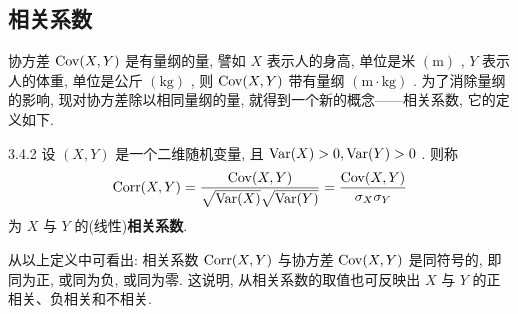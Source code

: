 	\subsection{相关系数}\label{ssec:3.4.4}
	协方差 $\operatorname{Cov}(X, Y)$ 是有量纲的量, 譬如 $X$ 表示人的身高, 单位是米 $(\mathrm{m})$ , $Y$ 表示人的体重, 单位是公斤 $(\mathrm{kg})$ , 则 $\operatorname{Cov}(X, Y)$ 带有量纲 $(\mathrm{m\cdot kg})$ . 为了消除量纲的影响, 现对协方差除以相同量纲的量, 就得到一个新的概念——相关系数, 它的定义如下.
	\begin{definition}{}{3.4.2}
		设 $(X,Y)$ 是一个二维随机变量, 且 $\operatorname{Var}(X)>0,\operatorname{Var}(Y)>0$ . 则称
		\begin{equation}\label{eq:3.4.10}
			\operatorname{Corr}(X, Y)=\frac{\operatorname{Cov}(X, Y)}{\sqrt{\operatorname{Var}(X)}\sqrt{\operatorname{Var}(Y)}}=\frac{\operatorname{Cov}(X, Y)}{\sigma_{X} \sigma_{Y}}
		\end{equation}
		为 $X$ 与 $Y$ 的(线性)\textbf{相关系数}.
	\end{definition}
	从以上定义中可看出: 相关系数 $\operatorname{Corr}(X, Y)$ 与协方差 $\operatorname{Cov}(X, Y)$ 是同符号的, 即同为正, 或同为负, 或同为零. 这说明, 从相关系数的取值也可反映出 $X$ 与 $Y$ 的正相关、负相关和不相关.

